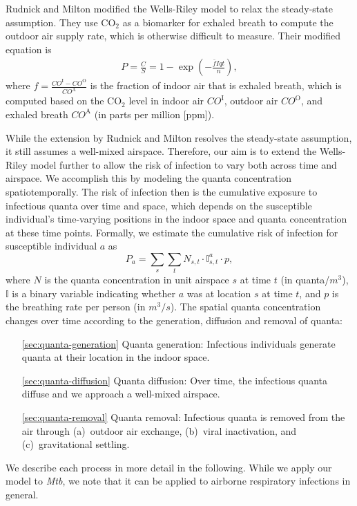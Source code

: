 \documentclass[fleqn,11pt]{wlscirep_supp}
\begin{document}
Rudnick and Milton\cite{Rudnick2003IndoorAir} modified the Wells-Riley model to relax the steady-state assumption. They use CO$_2$ as a biomarker for exhaled breath to compute the outdoor air supply rate, which is otherwise difficult to measure. Their modified equation is
\begin{align}
    P = \frac{C}{S} = 1 - \exp \left(-\frac{\bar{f}Iqt}{n}\right),
\end{align}
where $f = \frac{CO^{\text{I}}-CO^{\text{O}}}{CO^{\text{A}}}$ is the fraction of indoor air that is exhaled breath, which is computed based on the CO$_2$ level in indoor air $CO^{\text{I}}$, outdoor air $CO^{\text{O}}$, and exhaled breath $CO^{\text{A}}$ (in parts per million [ppm]). 

While the extension by Rudnick and Milton resolves the steady-state assumption, it still assumes a well-mixed airspace. Therefore, our aim is to extend the Wells-Riley model further to allow the risk of infection to vary both across time and airspace. We accomplish this by modeling the quanta concentration spatiotemporally. The risk of infection then is the cumulative exposure to infectious quanta over time and space, which depends on the susceptible individual's time-varying positions in the indoor space and quanta concentration at these time points. Formally, we estimate the cumulative risk of infection for susceptible individual $a$ as 
\begin{equation}\label{eq:spattemp-P}
    P_a = \sum_s \sum_t N_{s,t} \cdot \mathbb{I}_{s,t}^a \cdot p,
\end{equation}
where $N$ is the quanta concentration in unit airspace $s$ at time $t$ (in quanta/$m^3$), $\mathbb{I}$ is a binary variable indicating whether $a$ was at location $s$ at time $t$, and $p$ is the breathing rate per person (in $m^3/s$). The spatial quanta concentration changes over time according to the generation, diffusion and removal of quanta: 
\begin{itemize}
    \item[\ref{sec:quanta-generation}] Quanta generation: Infectious individuals generate quanta at their location in the indoor space. 
    \item[\ref{sec:quanta-diffusion}] Quanta diffusion: Over time, the infectious quanta diffuse and we approach a well-mixed airspace. 
    \item[\ref{sec:quanta-removal}] Quanta removal: Infectious quanta is removed from the air through (a)~outdoor air exchange, (b)~viral inactivation, and (c)~gravitational settling. 
\end{itemize}
We describe each process in more detail in the following. While we apply our model to \emph{Mtb}, we note that it can be applied to airborne respiratory infections in general.
\end{document}
